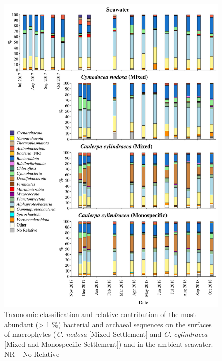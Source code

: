 \documentclass[12pt,]{article}
\begin{document}
\begin{figure}[H]

{\centering \includegraphics[width=0.85\linewidth]{../results/figures/community_bar_plot} 

}

\caption{Taxonomic classification and relative contribution of the most abundant (> 1 \si{\percent}) bacterial and archaeal sequences on the surfaces of macrophytes (\textit{C. nodosa} [Mixed Settlement] and \textit{C. cylindracea} [Mixed and Monospecific Settlement]) and in the ambient seawater. NR -- No Relative\label{community}}\label{fig:unnamed-chunk-4}
\end{figure}
\end{document}
